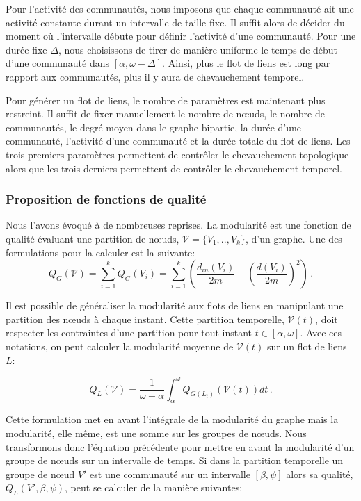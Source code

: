 Pour l'activité des communautés, nous imposons que chaque communauté ait une activité constante durant un intervalle de taille fixe.
Il suffit alors de décider du moment où l'intervalle débute pour définir l'activité d'une communauté.
Pour une durée fixe $\Delta$, nous choisissons de tirer de manière uniforme le temps de début d'une communauté dans $[\alpha,\omega-\Delta]$.
Ainsi, plus le flot de liens est long par rapport aux communautés, plus il y aura de chevauchement temporel.

\bigskip
Pour générer un flot de liens, le nombre de paramètres est maintenant plus restreint.
Il suffit de fixer manuellement le nombre de n\oe uds, le nombre de communautés, le degré moyen dans le graphe bipartie, la durée d'une communauté, l'activité d'une communauté et la durée totale du flot de liens.
Les trois premiers paramètres permettent de contrôler le chevauchement topologique alors que les trois derniers permettent de contrôler le chevauchement temporel.

\subsubsection{Proposition de fonctions de qualité}

Nous l'avons évoqué à de nombreuses reprises.
La modularité est une fonction de qualité évaluant une partition de n\oe uds, $\mathcal{V}=\{V_1,..,V_k\}$, d'un graphe.
Une des formulations pour la calculer est la suivante:
\begin{equation}
Q_G(\mathcal{V}) =  \sum_{i=1}^{k} Q_G(V_i) =\sum_{i=1}^{k} \left( \dfrac{d_{in}(V_i)}{2m}- \left(\dfrac{d(V_i)}{2m}\right)^2\right)\,.
\end{equation}

Il est possible de généraliser la modularité aux flots de liens en manipulant une partition des n\oe uds à chaque instant.
Cette partition temporelle, $\mathcal{V}(t)$, doit respecter les contraintes d'une partition pour tout instant $t \in [\alpha,\omega]$.
Avec ces notations, on peut calculer la modularité moyenne de $\mathcal{V}(t)$ sur un flot de liens $L$:

\begin{equation}
Q_L(\mathcal{V}) = \dfrac{1}{\omega-\alpha} \int_{\alpha}^{\omega} Q_{G(L_t)}(\mathcal{V}(t)) dt\,.
\label{eq:temp_modu}
\end{equation}

Cette formulation met en avant l'intégrale de la modularité du graphe mais la modularité, elle même, est une somme sur les groupes de n\oe uds.
Nous transformons donc l'équation précédente pour mettre en avant la modularité d'un groupe de n\oe uds sur un intervalle de temps.
Si dans la partition temporelle un groupe de n\oe ud $V'$ est une communauté sur un intervalle $[\beta, \psi]$ alors sa qualité,$Q_L(V', \beta, \psi)$, peut se calculer de la manière suivantes:


